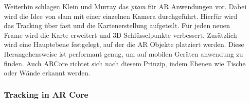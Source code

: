 Weiterhin schlagen Klein und Murray\cite*{klein2007} das \textit{\acrfull{ptam}} für AR Anwendungen vor. Dabei wird die Idee von \acrshort{slam} mit einer einzelnen Kamera durchgeführt. Hierfür wird das Tracking über \acrshort{fast} und die Kartenerstellung aufgeteilt. Für jeden neuen Frame wird die Karte erweitert und 3D Schlüsselpunkte verbessert. Zusätzlich wird eine Hauptebene festgelegt, auf der die AR Objekte platziert werden. Diese Herangehensweise ist performant genug, um auf mobilen Geräten anwendung zu finden\cite[Klein und Murray(2009)][]{klein2009}. Auch ARCore richtet sich nach diesem Prinzip, indem Ebenen wie Tische oder Wände erkannt werden.

\subsubsection{Tracking in AR Core}
